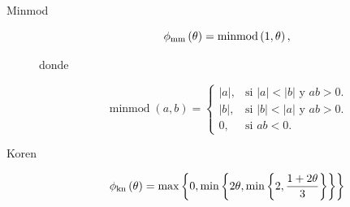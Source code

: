 \begin{description}
	\item[Minmod]

	      \begin{equation*}
		      \phi_{\text{\text{mm}}}
		      \left(\theta\right)=
		      \operatorname{minmod}
		      \left(1,\theta\right),
	      \end{equation*}

	      donde

	      \begin{equation*}
		      \operatorname{minmod}
		      \left(a,b\right)=
		      \begin{cases}
			      \left|a\right|,
			                      & \text{si }
			      \left|a\right|<\left|b\right|
			      \text{ y }ab>0.                   \\
			      \left|b\right|, & \text{si }
			      \left|b\right|<\left|a\right|
			      \text{ y }ab>0.                   \\
			      0,              & \text{si }ab<0.
		      \end{cases}
	      \end{equation*}

	\item[Koren]

	      \begin{equation*}
		      \phi_{\text{\text{kn}}}
		      \left(\theta\right)=
		      \max
		      \left\{
		      0,
		      \min
		      \left\{
		      2\theta,
		      \min
		      \left\{
		      2,
		      \frac{1+2\theta}{3}
		      \right\}
		      \right\}
		      \right\}
	      \end{equation*}
\end{description}

